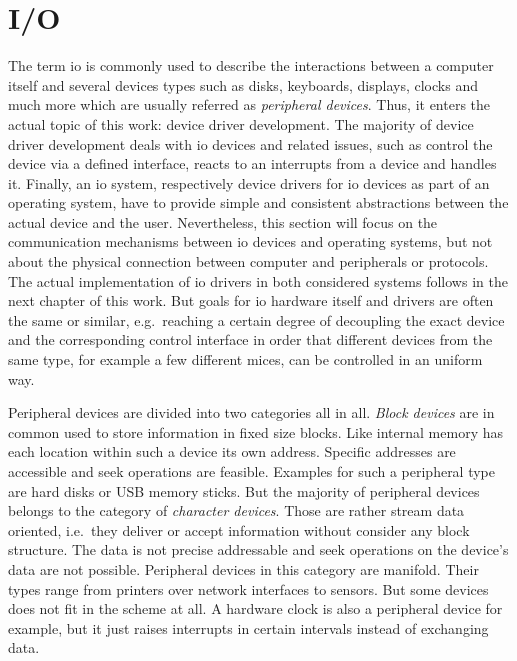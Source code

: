 \section{I/O}\label{sec:io} 
The term \acf{io} is commonly used to describe the interactions between a computer itself and several devices types such as disks, keyboards, displays, clocks and much more which are usually referred as \textit{peripheral devices}.
Thus, it enters the actual topic of this work: device driver development.
The majority of device driver development deals with \ac{io} devices and related issues, such as control the device via a defined interface, reacts to an interrupts from a device and handles it.
Finally, an \ac{io} system, respectively device drivers for \ac{io} devices as part of an operating system, have to provide simple and consistent abstractions between the actual device and the user\cite{tanenbaum-modern-operating-systems}.
Nevertheless, this section will focus on the communication mechanisms between \ac{io} devices and operating systems, but not about the physical connection between computer and peripherals or protocols.
The actual implementation of \ac{io} drivers in both considered systems follows in the next chapter of this work.
But goals for \ac{io} hardware itself and drivers are often the same or similar, e.g.\ reaching a certain degree of decoupling the exact device and the corresponding control interface in order that different devices from the same type, for example a few different mices, can be controlled in an uniform way\cite{tanenbaum-modern-operating-systems}.

Peripheral devices are divided into two categories all in all.
\textit{Block devices} are in common used to store information in fixed size blocks.
Like internal memory has each location within such a device its own address.
Specific addresses are accessible and seek operations are feasible.
Examples for such a peripheral type are hard disks or USB memory sticks\cite{tanenbaum-modern-operating-systems}.
But the majority of peripheral devices belongs to the category of \textit{character devices}.
Those are rather stream data oriented, i.e.\ they deliver or accept information without consider any block structure.
The data is not precise addressable and seek operations on the device's data are not possible.
Peripheral devices in this category are manifold.
Their types range from printers over network interfaces to sensors\cite{tanenbaum-modern-operating-systems}.
But some devices does not fit in the scheme at all.
A hardware clock is also a peripheral device for example, but it just raises interrupts in certain intervals instead of exchanging data.

